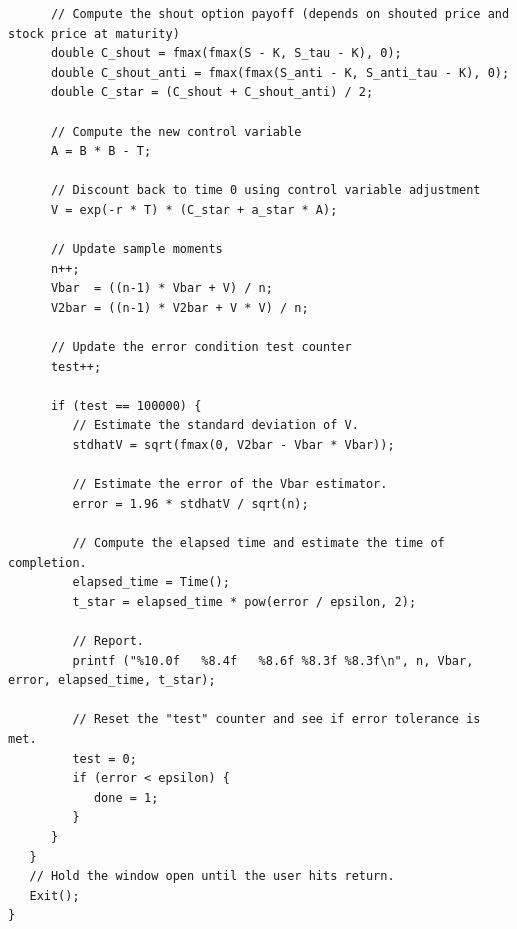 \documentclass{report}
\begin{document}
\begin{lstlisting}
      // Compute the shout option payoff (depends on shouted price and stock price at maturity)
      double C_shout = fmax(fmax(S - K, S_tau - K), 0);
      double C_shout_anti = fmax(fmax(S_anti - K, S_anti_tau - K), 0);
      double C_star = (C_shout + C_shout_anti) / 2;

      // Compute the new control variable
      A = B * B - T;

      // Discount back to time 0 using control variable adjustment
      V = exp(-r * T) * (C_star + a_star * A);

      // Update sample moments
      n++;
      Vbar  = ((n-1) * Vbar + V) / n;
      V2bar = ((n-1) * V2bar + V * V) / n;

      // Update the error condition test counter
      test++;

      if (test == 100000) {
         // Estimate the standard deviation of V.
         stdhatV = sqrt(fmax(0, V2bar - Vbar * Vbar));

         // Estimate the error of the Vbar estimator.
         error = 1.96 * stdhatV / sqrt(n);

         // Compute the elapsed time and estimate the time of completion.
         elapsed_time = Time();
         t_star = elapsed_time * pow(error / epsilon, 2);

         // Report.
         printf ("%10.0f   %8.4f   %8.6f %8.3f %8.3f\n", n, Vbar, error, elapsed_time, t_star);
        
         // Reset the "test" counter and see if error tolerance is met.
         test = 0;
         if (error < epsilon) {
            done = 1;
         }
      }
   }
   // Hold the window open until the user hits return.
   Exit();
}

\end{lstlisting}
\end{document}
